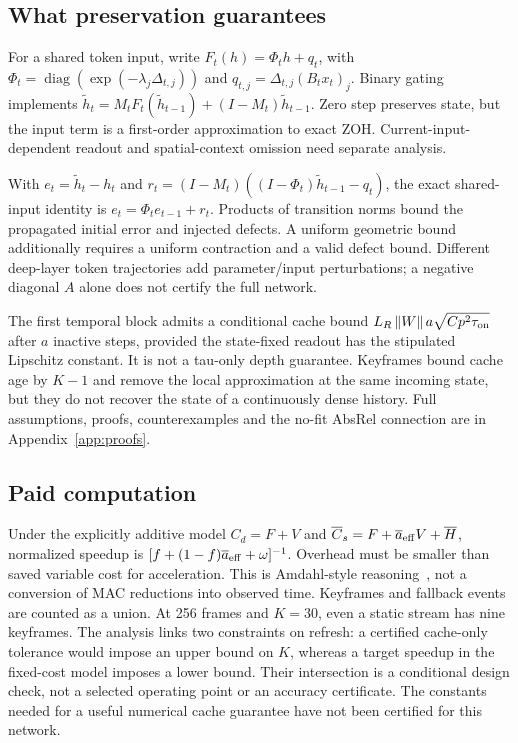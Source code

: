 \documentclass[mathematics,article,submit,moreauthors]{Definitions/mdpi}
\providecommand{\norm}[1]{\left\lVert#1\right\rVert}
\begin{document}
\subsection{What preservation guarantees}
For a shared token input, write $F_t(h)=\Phi_t h+q_t$, with
$\Phi_t=\operatorname{diag}(\exp(-\lambda_j\Delta_{t,j}))$ and
$q_{t,j}=\Delta_{t,j}(B_tx_t)_j$. Binary gating implements
$\widetilde h_t=M_tF_t(\widetilde h_{t-1})+(I-M_t)\widetilde h_{t-1}$.
Zero step preserves state, but the input term is a first-order approximation to exact
ZOH. Current-input-dependent readout and spatial-context omission need separate analysis.

With $e_t=\widetilde h_t-h_t$ and
$r_t=(I-M_t)((I-\Phi_t)\widetilde h_{t-1}-q_t)$, the exact shared-input identity is
$e_t=\Phi_te_{t-1}+r_t$. Products of transition norms bound the propagated initial
error and injected defects. A uniform geometric bound additionally requires a uniform
contraction and a valid defect bound. Different deep-layer token trajectories add
parameter/input perturbations; a negative diagonal $A$ alone does not certify the full network.

The first temporal block admits a conditional cache bound
$L_R\norm{W}a\sqrt{Cp^2\tau_{\rm on}}$ after $a$ inactive steps, provided the
state-fixed readout has the stipulated Lipschitz constant. It is not a tau-only
depth guarantee. Keyframes bound cache age by $K-1$ and remove the local approximation
at the same incoming state, but they do not recover the state of a continuously dense history.
Full assumptions, proofs, counterexamples and the no-fit AbsRel connection are in Appendix~\ref{app:proofs}.

\subsection{Paid computation}
Under the explicitly additive model $C_d=F+V$ and
$\overline C_s=F+\overline a_{\rm eff}V+\overline H$, normalized speedup is
$[f+(1-f)\overline a_{\rm eff}+\omega]^{-1}$. Overhead must be smaller than
saved variable cost for acceleration. This is Amdahl-style reasoning~\cite{amdahl1967},
not a conversion of MAC reductions into observed time. Keyframes and fallback events
are counted as a union. At 256 frames and $K=30$, even a static stream has nine keyframes.
The analysis links two constraints on refresh: a certified cache-only tolerance
would impose an upper bound on $K$, whereas a target speedup in the fixed-cost
model imposes a lower bound. Their intersection is a conditional design check,
not a selected operating point or an accuracy certificate. The constants needed
for a useful numerical cache guarantee have not been certified for this network.
\end{document}

